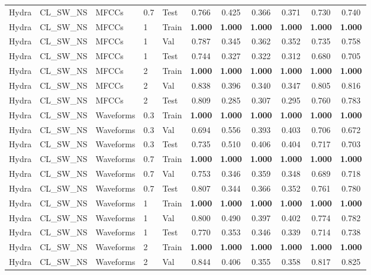 \begin{landscape}
\begin{longtable}{|l|l|l|l|l|c|c|c|c|c|c|}
Hydra & CL\_SW\_NS & MFCCs & 0.7 & Test & 0.766 & 0.425 & 0.366 & 0.371 & 0.730 & 0.740 \\
Hydra & CL\_SW\_NS & MFCCs & 1 & Train & \textbf{1.000} & \textbf{1.000} & \textbf{1.000} & \textbf{1.000} & \textbf{1.000} & \textbf{1.000} \\
Hydra & CL\_SW\_NS & MFCCs & 1 & Val & 0.787 & 0.345 & 0.362 & 0.352 & 0.735 & 0.758 \\
Hydra & CL\_SW\_NS & MFCCs & 1 & Test & 0.744 & 0.327 & 0.322 & 0.312 & 0.680 & 0.705 \\
Hydra & CL\_SW\_NS & MFCCs & 2 & Train & \textbf{1.000} & \textbf{1.000} & \textbf{1.000} & \textbf{1.000} & \textbf{1.000} & \textbf{1.000} \\
Hydra & CL\_SW\_NS & MFCCs & 2 & Val & 0.838 & 0.396 & 0.340 & 0.347 & 0.805 & 0.816 \\
Hydra & CL\_SW\_NS & MFCCs & 2 & Test & 0.809 & 0.285 & 0.307 & 0.295 & 0.760 & 0.783 \\
Hydra & CL\_SW\_NS & Waveforms & 0.3 & Train & \textbf{1.000} & \textbf{1.000} & \textbf{1.000} & \textbf{1.000} & \textbf{1.000} & \textbf{1.000} \\
Hydra & CL\_SW\_NS & Waveforms & 0.3 & Val & 0.694 & 0.556 & 0.393 & 0.403 & 0.706 & 0.672 \\
Hydra & CL\_SW\_NS & Waveforms & 0.3 & Test & 0.735 & 0.510 & 0.406 & 0.404 & 0.717 & 0.703 \\
Hydra & CL\_SW\_NS & Waveforms & 0.7 & Train & \textbf{1.000} & \textbf{1.000} & \textbf{1.000} & \textbf{1.000} & \textbf{1.000} & \textbf{1.000} \\
Hydra & CL\_SW\_NS & Waveforms & 0.7 & Val & 0.753 & 0.346 & 0.359 & 0.348 & 0.689 & 0.718 \\
Hydra & CL\_SW\_NS & Waveforms & 0.7 & Test & 0.807 & 0.344 & 0.366 & 0.352 & 0.761 & 0.780 \\
Hydra & CL\_SW\_NS & Waveforms & 1 & Train & \textbf{1.000} & \textbf{1.000} & \textbf{1.000} & \textbf{1.000} & \textbf{1.000} & \textbf{1.000} \\
Hydra & CL\_SW\_NS & Waveforms & 1 & Val & 0.800 & 0.490 & 0.397 & 0.402 & 0.774 & 0.782 \\
Hydra & CL\_SW\_NS & Waveforms & 1 & Test & 0.770 & 0.353 & 0.346 & 0.339 & 0.714 & 0.738 \\
Hydra & CL\_SW\_NS & Waveforms & 2 & Train & \textbf{1.000} & \textbf{1.000} & \textbf{1.000} & \textbf{1.000} & \textbf{1.000} & \textbf{1.000} \\
Hydra & CL\_SW\_NS & Waveforms & 2 & Val & 0.844 & 0.406 & 0.355 & 0.358 & 0.817 & 0.825 \\

\end{longtable}
\end{landscape}
